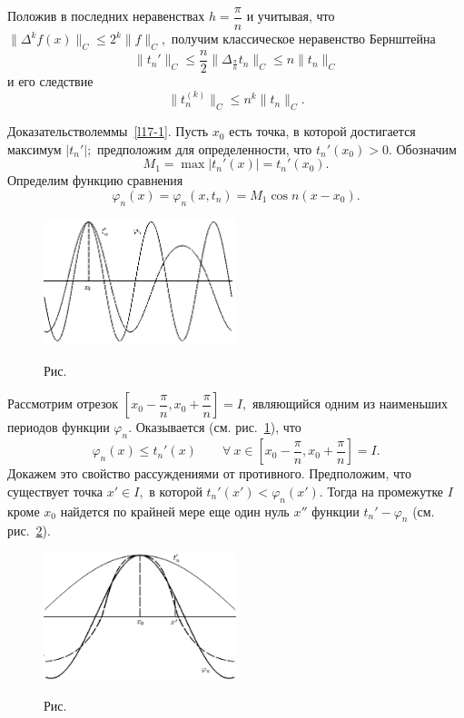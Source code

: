 Положив в последних неравенствах $h=\dfrac{\pi}{n}$ и
учитывая, что $\|\Delta^kf(x)\|_C\le 2^k\|f\|_C,$
 получим классическое неравенство  Бернштейна
\begin{equation}\label{17-2}
 \|t_n'\|_C\le \frac{n}{2} \|\Delta_{\frac{\pi}{n}} t_n\|_C \le
 n\|t_n\|_C
\end{equation}
и его следствие
$$
\|t_n^{(k)}\|_C\le n^k \|t_n\|_C.
$$


 Д\;о\;к\;а\;з\;а\;т\;е\;л\;ь\;с\;т\;в\;о\quad  леммы~\ref{l17-1}. Пусть $x_0$ есть точка,
 в которой достигается максимум $|t_n'|;$ предположим для определенности, что
 $t_n'(x_0)>0.$ Обозначим
 $$
 M_1= \max |t_n'(x)|=t_n'(x_0).
 $$
 Определим  функцию сравнения
 $$
 \varphi_n(x)= \varphi_n(x,t_n)=M_1\cos n(x-x_0).
 $$




\begin{figure}[ht]
\begin{center}
\includegraphics[width=0.5\textwidth]{pict17-1.eps}
\end{center}
 \label{r17-1}
 \centerline{Рис.~\theris}
\end{figure}

 \noindent
 Рассмотрим отрезок $\left[ x_0-\dfrac{\pi}{n}, x_0+\dfrac{\pi}{n}
 \right]=I,$ являющийся одним из наименьших периодов функции $\varphi_n.$
 Оказывается (см. рис.~\ref{r17-1}), что
$$
 \varphi_n(x)\le t_n'(x)\qquad \forall\ x\in
 \left[ x_0-\frac{\pi}{n}, x_0+\frac{\pi}{n}\right]=I.
$$
 Докажем это свойство рассуждениями  от противного. Предположим, что существует точка $x'\in I,$
 в которой $t_n'(x')< \varphi_n(x').$ {Тогда на промежутке $I$ кроме $x_0$ найдется}
{по крайней мере еще один нуль $x''$ функции
$t_n'-\varphi_n$ {(см. рис.~\ref{r17-2}).}}

\begin{figure}[ht]
\begin{center}
\includegraphics[width=0.5\textwidth]{pict17-2.eps}
\end{center}
 \label{r17-2}

\centerline{Рис.~\theris}
\end{figure}

